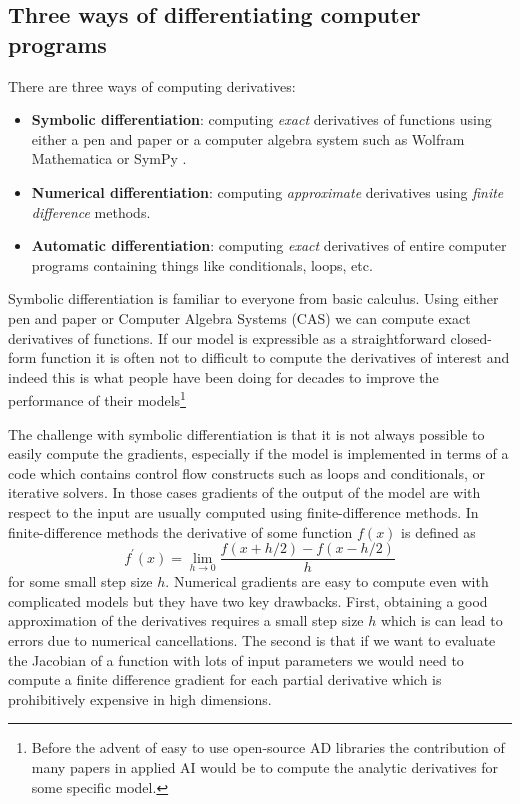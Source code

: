 \documentclass[12pt,dvipsnames]{report}
\begin{document}
\subsection{Three ways of differentiating computer programs}
There are three ways of computing derivatives:
\begin{itemize}
    \item \textbf{Symbolic differentiation}: computing \emph{exact} derivatives of 
    functions using either a pen and paper or a computer algebra system such as 
    \textsf{Wolfram Mathematica} or \textsf{SymPy} \citep{10.7717/peerj-cs.103}.
    \item \textbf{Numerical differentiation}: computing \emph{approximate} derivatives 
    using \textsl{finite difference}  methods.
    \item \textbf{Automatic differentiation}: computing \emph{exact} derivatives of entire 
    computer programs containing things like conditionals, loops, etc.
\end{itemize}
Symbolic differentiation is familiar to everyone from basic calculus. Using either 
pen and paper  or Computer Algebra Systems (CAS) we can compute exact 
derivatives of functions. 
If our model is expressible as a straightforward closed-form function it is 
often not to difficult to compute the derivatives of interest and indeed this 
is what people have been doing for decades to improve the performance of their
models\footnote{Before the advent of easy to use open-source AD libraries 
the contribution of many papers in applied AI would be to compute the analytic 
derivatives for some specific model.}

The challenge with symbolic differentiation is that it is not always possible 
to easily compute the gradients, especially if the model is implemented in terms 
of a code which contains control flow constructs such as loops and conditionals, 
or iterative solvers. In those cases gradients of the output of the model 
are with respect to the input are usually computed using finite-difference 
methods. In finite-difference methods the derivative of some function $f(x)$
is defined as 
\begin{equation}
    f^\prime(x)=\lim _{h \rightarrow 0} \frac{f(x+h / 2)-f(x-h / 2)}{h}
\end{equation}
for some small step size $h$. Numerical gradients are easy to compute even with 
complicated models but they have two key drawbacks. First, obtaining a 
good approximation of the derivatives requires a small step size $h$ which is 
can lead to errors due to numerical cancellations.
The second is that if we want to evaluate the Jacobian of a function with lots 
of input parameters we would need to compute a finite difference gradient 
for each partial derivative which is prohibitively expensive in high dimensions.
\end{document}
